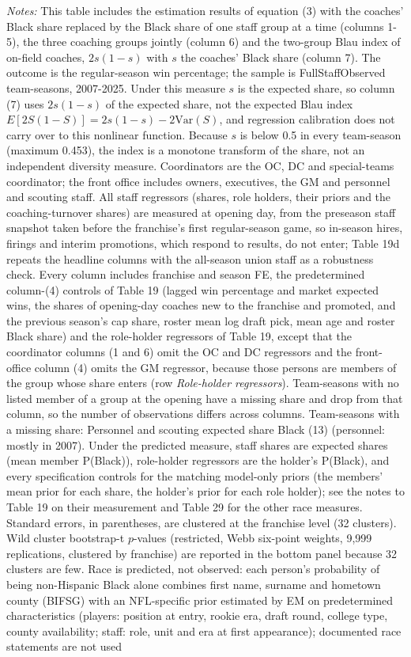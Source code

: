 {\footnotesize
\noindent\textit{Notes:} This table includes the estimation results of equation (3) with the coaches' Black share replaced by the Black share of one staff group at a time (columns 1-5), the three coaching groups jointly (column 6) and the two-group Blau index of on-field coaches, $2s(1-s)$ with $s$ the coaches' Black share (column 7). The outcome is the regular-season win percentage; the sample is FullStaffObserved team-seasons, 2007-2025. Under this measure $s$ is the expected share, so column (7) uses $2s(1-s)$ of the expected share, not the expected Blau index $E[2S(1-S)] = 2s(1-s) - 2\mathrm{Var}(S)$, and regression calibration does not carry over to this nonlinear function. Because $s$ is below 0.5 in every team-season (maximum 0.453), the index is a monotone transform of the share, not an independent diversity measure. Coordinators are the OC, DC and special-teams coordinator; the front office includes owners, executives, the GM and personnel and scouting staff. All staff regressors (shares, role holders, their priors and the coaching-turnover shares) are measured at opening day, from the preseason staff snapshot taken before the franchise's first regular-season game, so in-season hires, firings and interim promotions, which respond to results, do not enter; Table 19d repeats the headline columns with the all-season union staff as a robustness check. Every column includes franchise and season FE, the predetermined column-(4) controls of Table 19 (lagged win percentage and market expected wins, the shares of opening-day coaches new to the franchise and promoted, and the previous season's cap share, roster mean log draft pick, mean age and roster Black share) and the role-holder regressors of Table 19, except that the coordinator columns (1 and 6) omit the OC and DC regressors and the front-office column (4) omits the GM regressor, because those persons are members of the group whose share enters (row \textit{Role-holder regressors}). Team-seasons with no listed member of a group at the opening have a missing share and drop from that column, so the number of observations differs across columns. Team-seasons with a missing share: Personnel and scouting expected share Black (13) (personnel: mostly in 2007). Under the predicted measure, staff shares are expected shares (mean member P(Black)), role-holder regressors are the holder's P(Black), and every specification controls for the matching model-only priors (the members' mean prior for each share, the holder's prior for each role holder); see the notes to Table 19 on their measurement and Table 29 for the other race measures. Standard errors, in parentheses, are clustered at the franchise level (32 clusters). Wild cluster bootstrap-t $p$-values (restricted, Webb six-point weights, 9,999 replications, clustered by franchise) are reported in the bottom panel because 32 clusters are few. Race is predicted, not observed: each person's probability of being non-Hispanic Black alone combines first name, surname and hometown county (BIFSG) with an NFL-specific prior estimated by EM on predetermined characteristics (players: position at entry, rookie era, draft round, college type, county availability; staff: role, unit and era at first appearance); documented race statements are not used }
